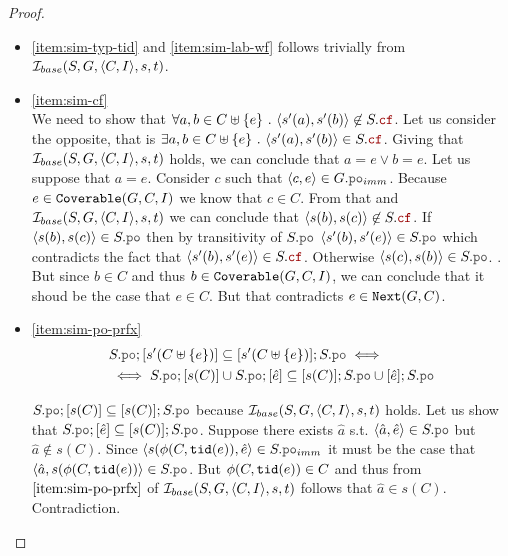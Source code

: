 \documentclass[12pt]{article}
\begin{document}
\begin{proof}
\begin{itemize}
  \item \ref{item:sim-typ-tid} and \ref{item:sim-lab-wf}
    follows trivially from $\mathcal{I}_{base}(S, G, \langle C, I \rangle, s, t)$.
    

  \item \ref{item:sim-cf} \\
    We need to show that
    $\forall{a, b \in \lC \uplus \{e\}} ~.~ \tup{s'(a), s'(b)} \not\in S.\lCF$.
    Let us consider the opposite, that is
    $\exists{a, b \in \lC \uplus \{e\}} ~.~ \tup{s'(a), s'(b)} \in S.\lCF$.
    Giving that $\mathcal{I}_{base}(S, G, \langle C, I \rangle, s, t)$ holds,
    we can conclude that \mbox{$a = e \vee b = e$}.
    Let us suppose that $a = e$.
    Consider $c$ such that $\tup{c, e} \in G.\lPO_{imm}$.
    Because $e \in {\mathtt{Coverable}}(G, C, I)$ we know that $c \in C$.
    From that and $\mathcal{I}_{base}(S, G, \langle C, I \rangle, s, t)$
    we can conclude that $\tup{s(b), s(c)} \not\in S.\lCF$.
    If $\tup{s(b), s(c)} \in S.\lPO$ then by transitivity of $S.\lPO$
    $\tup{s'(b), s'(e)} \in S.\lPO$
    which contradicts the fact that $\tup{s'(b), s'(e)} \in S.\lCF$.
    Otherwise \mbox{$\tup{s(c), s(b)} \in S.\lPO$}.
    .
    But since $b \in C$ and thus $b \in {\mathtt{Coverable}}(G, C, I)$,
    we can conclude that it shoud be the case that $e \in C$.
    But that contradicts $e \in {\mathtt{Next}}(G, C)$.

  \item \ref{item:sim-po-prfx} \\
    
    \begin{equation*}
      \begin{split}
        &     S.\lPO;[s'(C \uplus \{e\})] \subseteq [s'(C \uplus \{e\})];S.\lPO \iff \\
        &\iff S.\lPO;[s(C)] \cup S.\lPO;[\hat{e}] \subseteq [s(C)];S.\lPO \cup [\hat{e}];S.\lPO
      \end{split}
    \end{equation*}

    $S.\lPO;[s(C)] \subseteq [s(C)];S.\lPO$ because $\mathcal{I}_{base}(S, G, \langle C, I \rangle, s, t)$ holds.
    Let us show that $S.\lPO;[\hat{e}] \subseteq [s(C)];S.\lPO$.
    Suppose there exists $\hat{a}$ s.t. $\tup{\hat{a}, \hat{e}} \in S.\lPO$ but
    $\hat{a} \not\in s(C)$.
    Since $\tup{s(\front(C, \lTID(e)), \hat{e}} \in S.\lPO_{imm}$
    it must be the case that $\tup{\hat{a}, s(\front(C, \lTID(e))} \in S.\lPO$.
    But $\phi(C, {\mathtt{tid}}(e)) \in C$ and thus from $\ref{item:sim-po-prfx}$
    of $\mathcal{I}_{base}(S, G, \langle C, I \rangle, s, t)$ follows that $\hat{a} \in s(C)$. Contradiction.


\end{itemize}
\end{proof}
\end{document}
